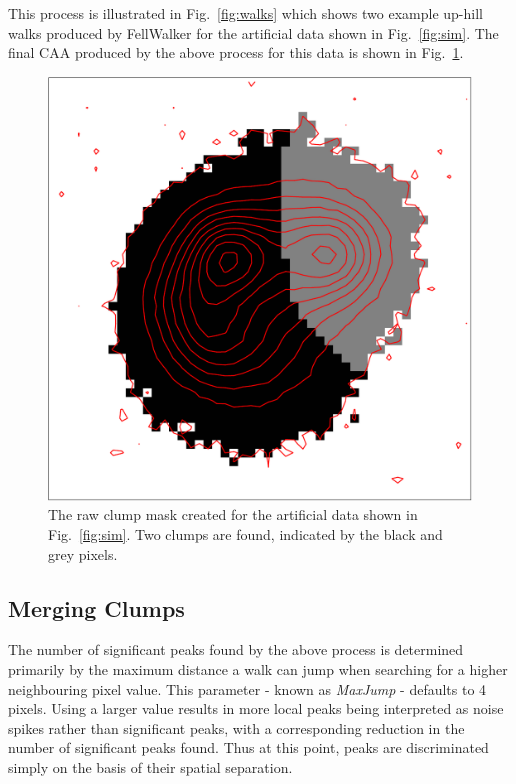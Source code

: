 \documentclass[final,authoryear,5p,times,twocolumn]{elsarticle}
\begin{document}
This process is illustrated in Fig.~\ref{fig:walks} which shows two
example up-hill walks produced by FellWalker for the artificial data shown
in Fig.~\ref{fig:sim}. The final CAA produced by the above process for
this data is shown in Fig.~\ref{fig:rawmask}.

\begin{figure}
\includegraphics[width=\columnwidth]{rawmask}
\caption{The raw clump mask created for the artificial data shown in
Fig.~\ref{fig:sim}. Two clumps are found, indicated by the black and grey
pixels.}
\label{fig:rawmask}
\end{figure}


\subsection{Merging Clumps}

The number of significant peaks found by the above process is determined
primarily by the maximum distance a walk can jump when searching for a
higher neighbouring pixel value. This parameter - known as \emph{MaxJump}
- defaults to 4 pixels. Using a larger value results in more local peaks
being interpreted as noise spikes rather than significant peaks, with a
corresponding reduction in the number of significant peaks found. Thus at
this point, peaks are discriminated simply on the basis of their spatial
separation.
\end{document}
